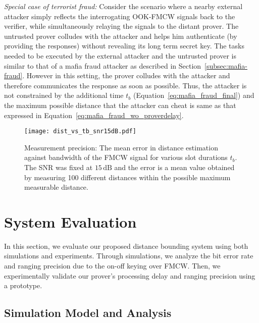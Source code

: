 \documentclass{sig-alternate-10pt}
\newcommand{\unit}[1]{\ensuremath{\, \mathrm{#1}}}
\begin{document}
\emph{Special case of terrorist fraud:} Consider the scenario where a nearby
external attacker simply reflects the interrogating OOK-FMCW signals back to the
verifier, while simultaneously relaying the signals to the distant prover. The
untrusted prover colludes with the attacker and helps him authenticate (by
providing the responses) without revealing its long term secret key. The tasks
needed to be executed by the external attacker and the untrusted prover is
similar to that of a mafia fraud attacker as described in
Section~\ref{subsec:mafia-fraud}. However in this setting, the prover colludes
with the attacker and therefore communicates the response as soon as possible.
Thus, the attacker is not constrained by the additional time $t_b$
(Equation~\eqref{eq:mafia_fraud_final}) and the maximum possible distance that
the attacker can cheat is same as that expressed in
Equation~\eqref{eq:mafia_fraud_wo_proverdelay}.

\begin{figure}[t]
  \centering
  \texttt{[image: dist\_vs\_tb\_snr15dB.pdf]}
  \caption{Measurement precision: The mean error in distance estimation against
    bandwidth of the FMCW signal for various slot durations $t_b$. The SNR was
    fixed at $15\unit{dB}$ and the error is a mean value obtained by measuring
    100 different distances within the possible maximum measurable distance.}
  \label{fig:dist_bw_plot}
\end{figure}



\section{System Evaluation}
\label{sec:system-evaluation}

In this section, we evaluate our proposed distance bounding system using both
simulations and experiments. Through simulations, we analyze the bit error rate
and ranging precision due to the on-off keying over FMCW. Then, we
experimentally validate our prover's processing delay and ranging precision
using a prototype.

\subsection{Simulation Model and Analysis}
\label{sec:simulation-setup}
\end{document}
